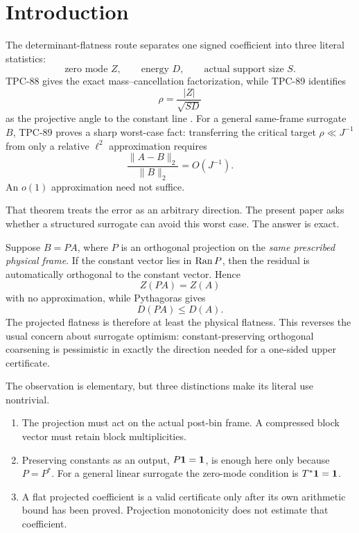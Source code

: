 \section{Introduction}
\label{sec:introduction}

The determinant-flatness route separates one signed coefficient into
three literal statistics:
\[
 \text{zero mode }Z,\qquad
 \text{energy }D,\qquad
 \text{actual support size }S.
\]
TPC-88 gives the exact mass--cancellation factorization, while
TPC-89 identifies
\[
 \rho=\frac{|Z|}{\sqrt{SD}}
\]
as the projective angle to the constant line
\citep{WangTPC88,WangTPC89}.  For a general same-frame surrogate
\(B\), TPC-89 proves a sharp worst-case fact: transferring the
critical target \(\rho\ll J^{-1}\) from only a relative
\(\ell^2\) approximation requires
\[
 \frac{\|A-B\|_2}{\|B\|_2}=O(J^{-1}).
\]
An \(o(1)\) approximation need not suffice.

That theorem treats the error as an arbitrary direction.  The
present paper asks whether a structured surrogate can avoid this
worst case.  The answer is exact.

Suppose \(B=PA\), where \(P\) is an orthogonal projection on the
\emph{same prescribed physical frame}.  If the constant vector lies
in \(\operatorname{Ran} P\), then the residual is automatically orthogonal to the
constant vector.  Hence
\[
 Z(PA)=Z(A)
\]
with no approximation, while Pythagoras gives
\[
 D(PA)\le D(A).
\]
The projected flatness is therefore at least the physical flatness.
This reverses the usual concern about surrogate optimism:
constant-preserving orthogonal coarsening is pessimistic in exactly
the direction needed for a one-sided upper certificate.

The observation is elementary, but three distinctions make its
literal use nontrivial.

\begin{enumerate}[label=(\roman*),leftmargin=2.2em]
\item The projection must act on the actual post-bin frame.  A
  compressed block vector must retain block multiplicities.
\item Preserving constants as an output, \(P\mathbf 1=\mathbf 1\), is enough
  here only because \(P=P^\ast\).  For a general linear surrogate
  the zero-mode condition is \(T^\ast\mathbf 1=\mathbf 1\).
\item A flat projected coefficient is a valid certificate only after
  its own arithmetic bound has been proved.  Projection monotonicity
  does not estimate that coefficient.
\end{enumerate}

